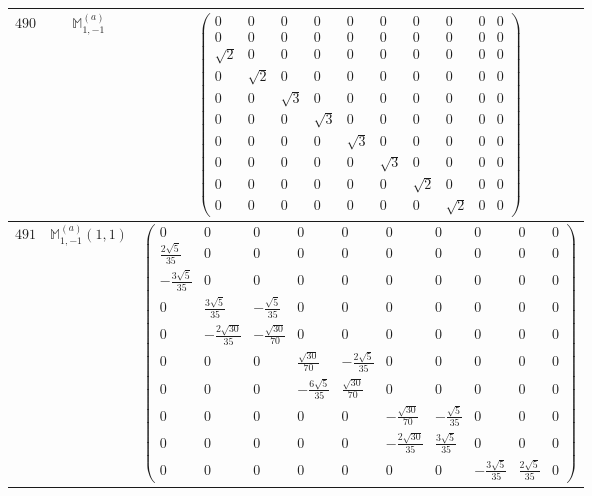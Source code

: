 \documentclass[fleqn,8pt,landscape]{jsarticle}
\begin{document}
\begin{center}
\begin{longtable}{ccc}
$ 490 $ & $ \mathbb{M}_{1,-1}^{(a)} $ & $ \begin{pmatrix} 0 & 0 & 0 & 0 & 0 & 0 & 0 & 0 & 0 & 0 \\ 0 & 0 & 0 & 0 & 0 & 0 & 0 & 0 & 0 & 0 \\ \sqrt{2} & 0 & 0 & 0 & 0 & 0 & 0 & 0 & 0 & 0 \\ 0 & \sqrt{2} & 0 & 0 & 0 & 0 & 0 & 0 & 0 & 0 \\ 0 & 0 & \sqrt{3} & 0 & 0 & 0 & 0 & 0 & 0 & 0 \\ 0 & 0 & 0 & \sqrt{3} & 0 & 0 & 0 & 0 & 0 & 0 \\ 0 & 0 & 0 & 0 & \sqrt{3} & 0 & 0 & 0 & 0 & 0 \\ 0 & 0 & 0 & 0 & 0 & \sqrt{3} & 0 & 0 & 0 & 0 \\ 0 & 0 & 0 & 0 & 0 & 0 & \sqrt{2} & 0 & 0 & 0 \\ 0 & 0 & 0 & 0 & 0 & 0 & 0 & \sqrt{2} & 0 & 0 \end{pmatrix} $ \\ \hline
$ 491 $ & $ \mathbb{M}_{1,-1}^{(a)}(1,1) $ & $ \begin{pmatrix} 0 & 0 & 0 & 0 & 0 & 0 & 0 & 0 & 0 & 0 \\ \frac{2 \sqrt{5}}{35} & 0 & 0 & 0 & 0 & 0 & 0 & 0 & 0 & 0 \\ - \frac{3 \sqrt{5}}{35} & 0 & 0 & 0 & 0 & 0 & 0 & 0 & 0 & 0 \\ 0 & \frac{3 \sqrt{5}}{35} & - \frac{\sqrt{5}}{35} & 0 & 0 & 0 & 0 & 0 & 0 & 0 \\ 0 & - \frac{2 \sqrt{30}}{35} & - \frac{\sqrt{30}}{70} & 0 & 0 & 0 & 0 & 0 & 0 & 0 \\ 0 & 0 & 0 & \frac{\sqrt{30}}{70} & - \frac{2 \sqrt{5}}{35} & 0 & 0 & 0 & 0 & 0 \\ 0 & 0 & 0 & - \frac{6 \sqrt{5}}{35} & \frac{\sqrt{30}}{70} & 0 & 0 & 0 & 0 & 0 \\ 0 & 0 & 0 & 0 & 0 & - \frac{\sqrt{30}}{70} & - \frac{\sqrt{5}}{35} & 0 & 0 & 0 \\ 0 & 0 & 0 & 0 & 0 & - \frac{2 \sqrt{30}}{35} & \frac{3 \sqrt{5}}{35} & 0 & 0 & 0 \\ 0 & 0 & 0 & 0 & 0 & 0 & 0 & - \frac{3 \sqrt{5}}{35} & \frac{2 \sqrt{5}}{35} & 0 \end{pmatrix} $ \\ \hline

\end{longtable}
\end{center}
\end{document}
